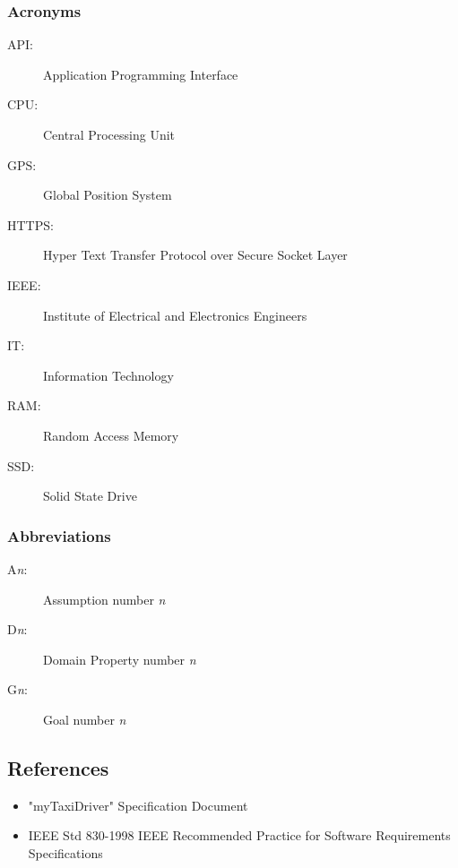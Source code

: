 \documentclass[a4paper]{article}
\begin{document}
\subsubsection{Acronyms}
\begin{description}
\item[API:] Application Programming Interface
\item[CPU:] Central Processing Unit
\item[GPS:] Global Position System
\item[HTTPS:] Hyper Text Transfer Protocol over Secure Socket Layer
\item[IEEE:] Institute of Electrical and Electronics Engineers
\item[IT:] Information Technology
\item[RAM:] Random Access Memory
\item[SSD:] Solid State Drive 
\end{description}

\subsubsection{Abbreviations}
\begin{description}
\item[A\emph{n}:] Assumption number \emph{n}
\item[D\emph{n}:] Domain Property number \emph{n}
\item[G\emph{n}:] Goal number \emph{n}
\end{description}

\subsection{References}
\begin{itemize}
\item "myTaxiDriver" Specification Document
\item IEEE Std 830-1998 IEEE Recommended Practice for Software Requirements Specifications
\end{itemize}
\end{document}
